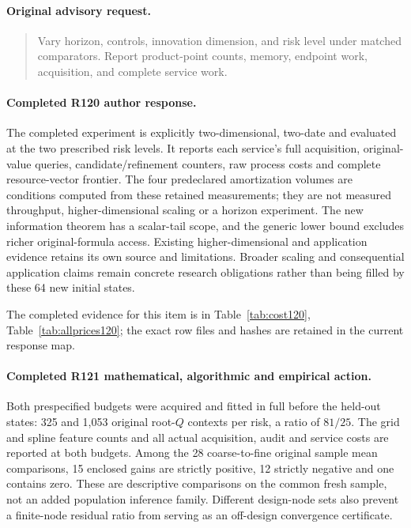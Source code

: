 \paragraph{Original advisory request.}
\begin{quote}
Vary horizon, controls, innovation dimension, and risk level under matched comparators. Report product-point counts, memory, endpoint work, acquisition, and complete service work.
\end{quote}

\paragraph{Completed R120 author response.}
The completed experiment is explicitly two-dimensional, two-date and evaluated at the two prescribed risk levels. It reports each service's full acquisition, original-value queries, candidate/refinement counters, raw process costs and complete resource-vector frontier. The four predeclared amortization volumes are conditions computed from these retained measurements; they are not measured throughput, higher-dimensional scaling or a horizon experiment. The new information theorem has a scalar-tail scope, and the generic lower bound excludes richer original-formula access. Existing higher-dimensional and application evidence retains its own source and limitations. Broader scaling and consequential application claims remain concrete research obligations rather than being filled by these 64 new initial states.

The completed evidence for this item is in Table~\ref{tab:cost120}, Table~\ref{tab:allprices120}; the exact row files and hashes are retained in the current response map.

\paragraph{Completed R121 mathematical, algorithmic and empirical action.}
Both prespecified budgets were acquired and fitted in full before the held-out states: 325 and 1,053 original root-$Q$ contexts per risk, a ratio of $81/25$. The grid and spline feature counts and all actual acquisition, audit and service costs are reported at both budgets. Among the 28 coarse-to-fine original sample mean comparisons, 15 enclosed gains are strictly positive, 12 strictly negative and one contains zero. These are descriptive comparisons on the common fresh sample, not an added population inference family. Different design-node sets also prevent a finite-node residual ratio from serving as an off-design convergence certificate.

